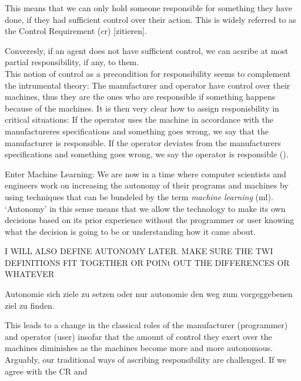 \documentclass{article}
\begin{document}
\vspace{.8em}
This means that we can only hold someone responsible for something they have
done, if they had sufficient control over their action.
This is widely referred to as the Control Requirement (\acrshort{cr}) [zitieren].

Converesly, if an agent does not have sufficient control, we can acsribe at most
partial responsibility, if any, to them.\\ 

This notion of control as a
precondition for responsibility seems to complement the intrumental theory: The
manufacturer and operator have control over their machines, thus they are the
ones who are responsible if something happens because of the machines.  It is
then very clear how to assign responisbility in critical situations: If the
operator uses the machine in accordance with the manufactureres specifications
and something goes wrong, we say that the manufacturer is responsible. If the
operator deviates from the manufacturers specifications and something goes
wrong, we say the operator is responsible (\cite[p.175]{Matthias_2004}).

Enter Machine Learning:
We are now in a time where computer scientists and engineers work on increasing
the autonomy of their programs and machines by using techniques that can be
bundeled by the term \textit{machine learning} (\acrshort{ml}). `Autonomy' in this sense
means that we allow the technology to make its own decisions based on its
prior experience without the programmer or user knowing what the decision is
going to be or understanding how it came about.

I WILL ALSO DEFINE AUTONOMY LATER. MAKE SURE THE TWI DEFINITIONS FIT TOGETHER OR
POINt OUT THE DIFFERENCES OR WHATEVER

Autonomie sich ziele zu setzen oder nur autonomie den weg zum vorgeggebenen ziel
zu finden. 


This leads to a change in the classical roles of the manufacturer
(programmer) and operator (user) insofar that the amount of control they exert
over the machines diminishes as the machines become more and more autonomous.
Arguably, our traditional ways of ascribing responsibility are challenged. If we
agree with the CR and 

\end{document}
